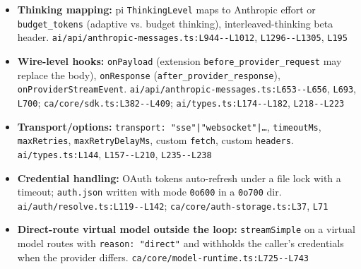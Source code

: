 \begin{itemize}
\item \textbf{Thinking mapping:} pi \texttt{ThinkingLevel} maps to Anthropic effort or \texttt{budget\_\allowbreak{}tokens} (adaptive vs. budget thinking), interleaved-thinking beta header. \texttt{ai/\allowbreak{}api/\allowbreak{}anthropic-\allowbreak{}messages.\allowbreak{}ts:\allowbreak{}L944-\allowbreak{}-\allowbreak{}L1012}, \texttt{L1296-\allowbreak{}-\allowbreak{}L1305}, \texttt{L195}
\item \textbf{Wire-level hooks:} \texttt{onPayload} (extension \texttt{before\_\allowbreak{}provider\_\allowbreak{}request} may replace the body), \texttt{onResponse} (\texttt{after\_\allowbreak{}provider\_\allowbreak{}response}), \texttt{onProviderStreamEvent}. \texttt{ai/\allowbreak{}api/\allowbreak{}anthropic-\allowbreak{}messages.\allowbreak{}ts:\allowbreak{}L653-\allowbreak{}-\allowbreak{}L656}, \texttt{L693}, \texttt{L700}; \texttt{ca/\allowbreak{}core/\allowbreak{}sdk.\allowbreak{}ts:\allowbreak{}L382-\allowbreak{}-\allowbreak{}L409}; \texttt{ai/\allowbreak{}types.\allowbreak{}ts:\allowbreak{}L174-\allowbreak{}-\allowbreak{}L182}, \texttt{L218-\allowbreak{}-\allowbreak{}L223}
\item \textbf{Transport/options:} \texttt{transport:\allowbreak{} "sse"|"websocket"|\ldots{}}, \texttt{timeoutMs}, \texttt{maxRetries}, \texttt{maxRetryDelayMs}, custom \texttt{fetch}, custom \texttt{headers}. \texttt{ai/\allowbreak{}types.\allowbreak{}ts:\allowbreak{}L144}, \texttt{L157-\allowbreak{}-\allowbreak{}L210}, \texttt{L235-\allowbreak{}-\allowbreak{}L238}
\item \textbf{Credential handling:} OAuth tokens auto-refresh under a file lock with a timeout; \texttt{auth.\allowbreak{}json} written with mode \texttt{0o600} in a \texttt{0o700} dir. \texttt{ai/\allowbreak{}auth/\allowbreak{}resolve.\allowbreak{}ts:\allowbreak{}L119-\allowbreak{}-\allowbreak{}L142}; \texttt{ca/\allowbreak{}core/\allowbreak{}auth-\allowbreak{}storage.\allowbreak{}ts:\allowbreak{}L37}, \texttt{L71}
\item \textbf{Direct-route virtual model outside the loop:} \texttt{streamSimple} on a virtual model routes with \texttt{reason:\allowbreak{} "direct"} and withholds the caller's credentials when the provider differs. \texttt{ca/\allowbreak{}core/\allowbreak{}model-\allowbreak{}runtime.\allowbreak{}ts:\allowbreak{}L725-\allowbreak{}-\allowbreak{}L743}
\end{itemize}

